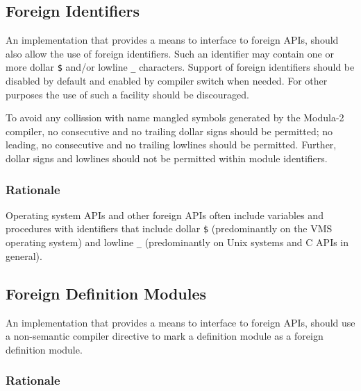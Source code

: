 \documentclass[10pt,a4paper]{article}
\begin{document}
\subsection{Foreign Identifiers}

An implementation that provides a means to interface to \glspl{foreign API},
should also allow the use of \glspl{foreign identifier}. Such an identifier may
contain one or more dollar \verb|$| and/or lowline \verb|_| characters. Support
of \glspl{foreign identifier} should be disabled by default and enabled by
compiler switch when needed. For other purposes the use of such a facility
should be discouraged.

To avoid any collission with name mangled symbols generated by the Modula-2
compiler, no consecutive and no trailing dollar signs should be permitted; no
leading, no consecutive and no trailing lowlines should be permitted. Further,
dollar signs and lowlines should not be permitted within module identifiers. 

\subsubsection{Rationale}

Operating system \Glspl{API} and other \glspl{foreign API} often include
variables and procedures with identifiers that include dollar \verb|$|
(predominantly on the VMS operating system) and lowline \verb|_|
(predominantly on Unix systems and C \glspl{API} in general).



\subsection{Foreign Definition Modules}

An implementation that provides a means to interface to \glspl{foreign API},
should use a \gls{non-semantic compiler directive} to mark a definition module
as a \gls{foreign definition module}.

\subsubsection{Rationale}
\end{document}
